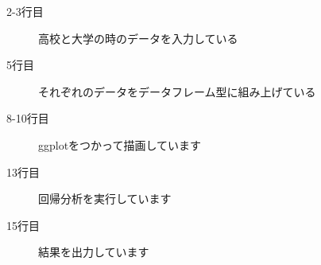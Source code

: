 \begin{description}
	\item[2-3行目] 高校と大学の時のデータを入力している
	\item[5行目] それぞれのデータをデータフレーム型に組み上げている
	\item[8-10行目] ggplotをつかって描画しています
	\item[13行目] 回帰分析を実行しています
	\item[15行目] 結果を出力しています
\end{description}
